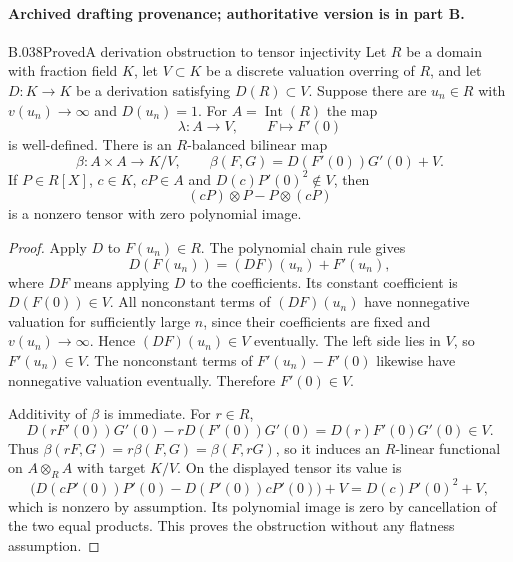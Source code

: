 \paragraph*{Archived drafting provenance; authoritative version is in part B.}
\begin{saresult}{B.038}{Proved}{A derivation obstruction to tensor injectivity}
Let $R$ be a domain with fraction field $K$, let $V\subset K$ be
a discrete valuation overring of $R$, and let $D:K\to K$ be a
derivation satisfying $D(R)\subset V$. Suppose there are
$u_n\in R$ with $v(u_n)\to\infty$ and $D(u_n)=1$.
For $A=\operatorname{Int}(R)$ the map
\[
 \lambda:A\longrightarrow V,\qquad F\longmapsto F'(0)
\]
is well-defined. There is an $R$-balanced bilinear map
\[
 \beta:A\times A\longrightarrow K/V,
 \qquad \beta(F,G)=D(F'(0))G'(0)+V.
\]
If $P\in R[X]$, $c\in K$, $cP\in A$ and
$D(c)P'(0)^2\notin V$, then
\[
 (cP)\otimes P-P\otimes(cP)
\]
is a nonzero tensor with zero polynomial image.
\end{saresult}
\begin{proof}
Apply $D$ to $F(u_n)\in R$. The polynomial chain rule gives
\[
 D(F(u_n))=(DF)(u_n)+F'(u_n),
\]
where $DF$ means applying $D$ to the coefficients.
Its constant coefficient is $D(F(0))\in V$.
All nonconstant terms of $(DF)(u_n)$ have nonnegative valuation
for sufficiently large $n$, since their coefficients are fixed
and $v(u_n)\to\infty$. Hence $(DF)(u_n)\in V$ eventually.
The left side lies in $V$, so $F'(u_n)\in V$.
The nonconstant terms of $F'(u_n)-F'(0)$ likewise have
nonnegative valuation eventually. Therefore $F'(0)\in V$.

Additivity of $\beta$ is immediate. For $r\in R$,
\[
 D(rF'(0))G'(0)-rD(F'(0))G'(0)
   =D(r)F'(0)G'(0)\in V.
\]
Thus $\beta(rF,G)=r\beta(F,G)=\beta(F,rG)$, so it induces
an $R$-linear functional on $A\otimes_RA$ with target $K/V$.
On the displayed tensor its value is
\[
 \bigl(D(cP'(0))P'(0)-D(P'(0))cP'(0)\bigr)+V
   =D(c)P'(0)^2+V,
\]
which is nonzero by assumption. Its polynomial image is zero
by cancellation of the two equal products. This proves the
obstruction without any flatness assumption.
\end{proof}

